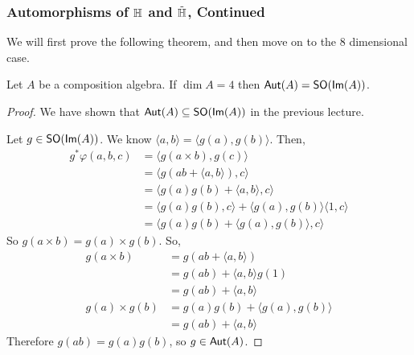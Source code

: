 \subsubsection{Automorphisms of $\operatorname{\mathbb{H}}$ and $\tilde{\operatorname{\mathbb{H}}}$, Continued}
We will first prove the following theorem, and then move on to the 8 dimensional case.
\begin{thm}
Let $A$ be a composition algebra.
    If $\dim A = 4$ then $\operatorname{\textsf{Aut}}(A) = \operatorname{\textsf{SO}}(\textsf{Im}(A))$.
\end{thm}
\begin{proof}
    We have shown that $\operatorname{\textsf{Aut}}(A)\subseteq \operatorname{\textsf{SO}}(\textsf{Im}(A))$ in the previous lecture.

    Let $g \in \operatorname{\textsf{SO}}(\textsf{Im}(A))$. We know $\langle a,b\rangle = \langle g(a),g(b)\rangle$. Then,
    \begin{align*}
        g^*\varphi(a,b,c) &= \langle g(a\times b),g(c)\rangle\\
        &=\langle g(ab+\langle a,b\rangle),c\rangle\\
        &= \langle g(a)g(b)+\langle a,b\rangle,c\rangle\\
        &= \langle g(a)g(b),c\rangle + \langle g(a),g(b)\rangle \langle 1,c\rangle\\
        &= \langle g(a)g(b)+\langle g(a),g(b)\rangle ,c\rangle
    \end{align*}
    So $g(a\times b) = g(a)\times g(b)$. So,
    \begin{align*}
        g(a\times b) &= g(ab+\langle a,b\rangle)\\&= g(ab)+\langle a,b\rangle g(1)\\&= g(ab)+\langle a,b\rangle\\
        g(a)\times g(b) &=g(a)g(b) + \langle g(a),g(b)\rangle\\
        &= g(ab)+\langle a,b\rangle
    \end{align*}
    Therefore $g(ab)=g(a)g(b)$, so $g\in \operatorname{\textsf{Aut}}(A)$.
\end{proof}
